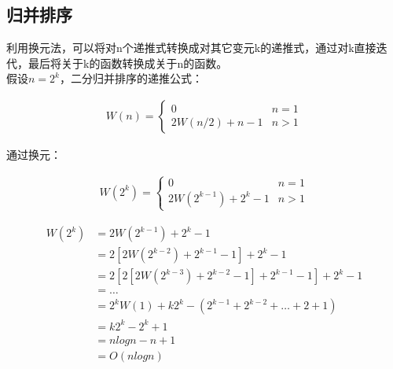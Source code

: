 \subsection{归并排序}

利用换元法，可以将对n个递推式转换成对其它变元k的递推式，通过对k直接迭代，最后将关于k的函数转换成关于n的函数。 \\

假设$ n = 2^k $，二分归并排序的递推公式：

\vspace{-0.5cm}

\begin{align*}
    W(n) = \begin{cases}
        0               & n = 1 \\
        2W(n/2) + n - 1 & n > 1
    \end{cases}
\end{align*}

通过换元：

\vspace{-0.5cm}

\begin{align*}
    W(2^k) = \begin{cases}
        0                     & n = 1 \\
        2W(2^{k-1}) + 2^k - 1 & n > 1
    \end{cases}
\end{align*}

\vspace{-0.5cm}

\begin{align*}
    W(2^k) & = 2W(2^{k-1}) + 2^k - 1                                   \\
           & = 2[2W(2^{k-2}) + 2^{k-1} - 1] + 2^k - 1                  \\
           & = 2[2[2W(2^{k-3}) + 2^{k-2} - 1] + 2^{k-1} - 1] + 2^k - 1 \\
           & = \dots                                                   \\
           & = 2^k W(1) + k2^k - (2^{k-1} + 2^{k-2} + \dots + 2 + 1)   \\
           & = k2^k - 2^k + 1                                          \\
           & = nlogn - n + 1                                           \\
           & = O(nlogn)
\end{align*}

\newpage

